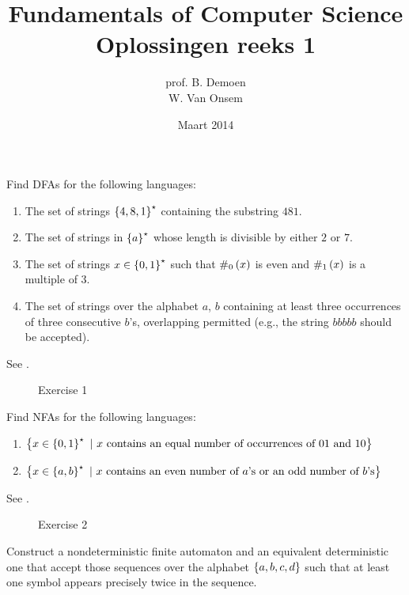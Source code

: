 \documentclass{article}
\title{Fundamentals of Computer Science\\Oplossingen reeks 1}
\author{prof. B. Demoen\\W. Van Onsem}
\date{Maart 2014}
\begin{document}
\maketitle
\begin{question}
Find DFAs for the following languages:
\begin{enumerate}
 \item The set of strings $\left\{ 4,8,1 \right\}^{\star}$ containing the substring $481$.
 \item The set of strings in $\left\{ a \right\}^{\star}$ whose length is divisible by either $2$ or $7$.
 \item The set of strings $x\in\left\{ 0,1 \right\}^{\star}$ such that $\#_0\left( x \right)$ is even and $\#_1\left( x \right)$ is a multiple of $3$.
 \item The set of strings over the alphabet $a$, $b$ containing at least three occurrences of three consecutive $b$'s, overlapping permitted (e.g., the string $bbbbb$ should be accepted).
\end{enumerate}
\begin{answer}See .
\begin{figure}[H]
\caption{Exercise 1}
\end{figure}
\end{answer}
\end{question}
\begin{question}
Find NFAs for the following languages:
\begin{enumerate}
 \item $\left\{ x\in\left\{ 0,1 \right\}^{\star}\ |\ \mbox{$x$ contains an equal number of occurrences of $01$ and $10$} \right\}$
 \item $\left\{ x\in\left\{ a,b \right\}^{\star}\ |\ \mbox{$x$ contains an even number of $a$'s or an odd number of $b$'s} \right\}$
\end{enumerate}
\begin{answer}See .
\begin{figure}[H]
\caption{Exercise 2}
\end{figure}
\end{answer}
\end{question}
\begin{question}
Construct a nondeterministic finite automaton and an equivalent deterministic one that accept those sequences over the alphabet $\left\{ a,b,c,d \right\}$ such that at least one symbol appears precisely twice in the sequence.
\begin{answer}
\end{answer}
\end{question}
\end{document}
